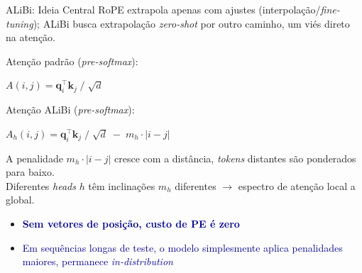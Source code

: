 \documentclass[aspectratio=169, xcolor=dvipsnames]{beamer}
\begin{document}
  \begin{frame}{ALiBi: Ideia Central}
    \textcolor{MidGray}{\small RoPE extrapola apenas com ajustes (interpolação/\textit{fine-tuning}); ALiBi busca extrapolação \textit{zero-shot} por outro caminho, um viés direto na atenção.}

    \vspace{0.2em}
    Atenção padrão (\textit{pre-softmax}):
    \begin{exampleblock}{}
      $A(i, j) = \mathbf{q}_i^\top \mathbf{k}_j \;/\; \sqrt{d}$
    \end{exampleblock}

    Atenção ALiBi (\textit{pre-softmax}):
    \begin{block}{}
      $A_h(i, j) = \mathbf{q}_i^\top \mathbf{k}_j \;/\; \sqrt{d} \;-\; m_h \cdot |i - j|$
    \end{block}

    A penalidade $m_h \cdot |i{-}j|$ cresce com a distância, \textit{tokens} distantes são ponderados para baixo.\\
    Diferentes \textit{heads} $h$ têm inclinações $m_h$ diferentes $\to$ espectro de atenção local a global.

    \begin{itemize}
      \item \textcolor{DarkBlue}{\textbf{Sem vetores de posição, custo de PE é zero}}
      \item \textcolor{DarkBlue}{Em sequências longas de teste, o modelo simplesmente aplica penalidades maiores, permanece \textit{in-distribution}}
    \end{itemize}
  \end{frame}
\end{document}
